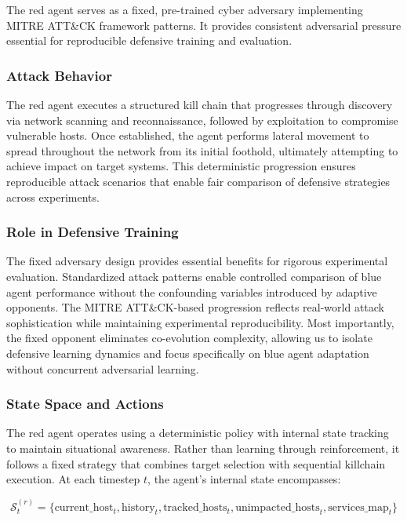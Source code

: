 \documentclass[12pt,oneside]{article}
\begin{document}
The red agent serves as a fixed, pre-trained cyber adversary implementing MITRE ATT\&CK framework \cite{mitre_attack_2023} patterns. It provides consistent adversarial pressure essential for reproducible defensive training and evaluation.

\subsubsection{Attack Behavior}
The red agent executes a structured kill chain that progresses through discovery via network scanning and reconnaissance, followed by exploitation to compromise vulnerable hosts. Once established, the agent performs lateral movement to spread throughout the network from its initial foothold, ultimately attempting to achieve impact on target systems. This deterministic progression ensures reproducible attack scenarios that enable fair comparison of defensive strategies across experiments.

\subsubsection{Role in Defensive Training}
The fixed adversary design provides essential benefits for rigorous experimental evaluation. Standardized attack patterns enable controlled comparison of blue agent performance without the confounding variables introduced by adaptive opponents. The MITRE ATT\&CK-based progression reflects real-world attack sophistication while maintaining experimental reproducibility. Most importantly, the fixed opponent eliminates co-evolution complexity, allowing us to isolate defensive learning dynamics and focus specifically on blue agent adaptation without concurrent adversarial learning.

\subsubsection{State Space and Actions}

The red agent operates using a deterministic policy with internal state tracking to maintain situational awareness. Rather than learning through reinforcement, it follows a fixed strategy that combines target selection with sequential killchain execution. At each timestep $t$, the agent's internal state encompasses:

\begin{equation}
\mathcal{S}^{(r)}_t = \{\text{current\_host}_t, \text{history}_t, \text{tracked\_hosts}_t, \text{unimpacted\_hosts}_t, \text{services\_map}_t\}
\end{equation}
\end{document}
